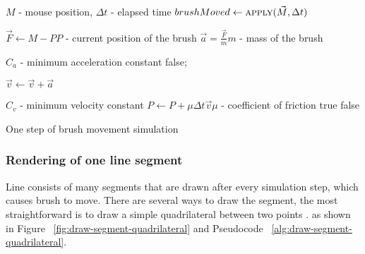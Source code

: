 \begin{pseudocode}
  \begin{algorithmic}

   \Comment $M$ - mouse position, $\Delta t$ - elapsed time
	      \State $brushMoved \gets \Call{apply}{\vec{M}, \Delta t} $
              \State {}
          \EndIf
      \EndIf
 \EndFunction

      \State $ \vec{F} \gets M - P $\Comment $P$ - current position of the brush
      \State $ \vec{a} = \frac{\vec{F}}{m} $\Comment $m$ - mass of the brush

       \Comment $C_a$ - minimum acceleration constant
	      \State \Return false;    
       \EndIf
      
      \State $\vec{v} \gets \vec{v} + \vec{a}$

       \Comment $C_v$ - minimum velocity constant
          \State $ P \gets P + \mu\Delta t\vec{v} $\Comment $\mu$ - coefficient of friction
		  \State \Return true
      \EndIf
      \State \Return false
  \EndFunction
\end{algorithmic}
\caption{One step of brush movement simulation}
\label{alg:one-step}
\end{pseudocode}

\subsubsection*{Rendering of one line segment}

Line consists of many segments that are drawn after every simulation step, which causes brush to move. There are several ways to draw the segment, the most straightforward is to draw a simple quadrilateral between two points . as shown in Figure ~\ref{fig:draw-segment-quadrilateral} and Pseudocode ~\ref{alg:draw-segment-quadrilateral}.


